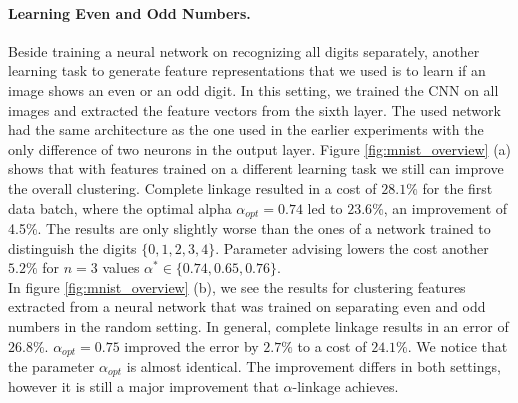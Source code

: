 \paragraph{Learning Even and Odd Numbers.} Beside training a neural network on recognizing all digits separately, another learning task to generate feature representations that we used is to learn if an image shows an even or an odd digit. In this setting, we trained the CNN on all images and extracted the feature vectors from the sixth layer. The used network had the same architecture as the one used in the earlier experiments with the only difference of two neurons in the output layer. Figure \ref{fig:mnist_overview} (a) shows that with features trained on a different learning task we still can improve the overall clustering. Complete linkage resulted in a cost of $28.1\%$ for the first data batch, where the optimal alpha $\alpha_{opt} = 0.74$ led to $23.6\%$, an improvement of 4.5\%. The results are only slightly worse than the ones of a network trained to distinguish the digits $\{0,1,2,3,4\}$. Parameter advising lowers the cost another $5.2\%$ for $n = 3$ values $\alpha^* \in \{0.74, 0.65, 0.76\}$.\\

In figure \ref{fig:mnist_overview} (b), we see the results for clustering features extracted from a neural network that was trained on separating even and odd numbers in the random setting. In general, complete linkage results in an error of $26.8\%$. $\alpha_{opt} = 0.75$ improved the error by $2.7\%$ to a cost of $24.1\%$. We notice that the parameter $\alpha_{opt}$ is almost identical. The improvement differs in both settings, however it is still a major improvement that $\alpha$-linkage achieves.

